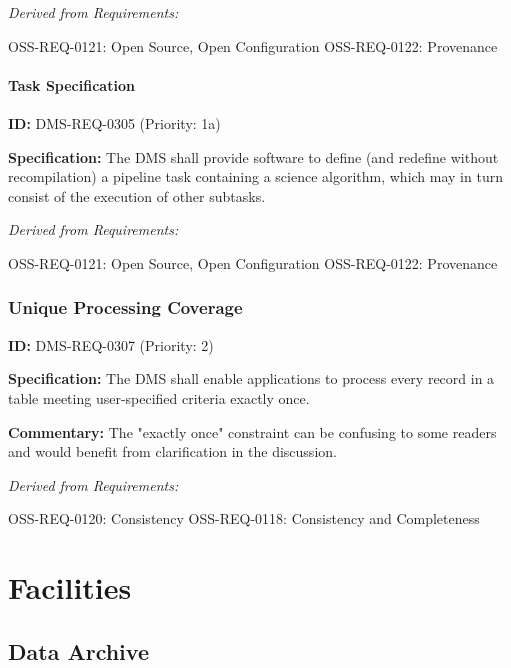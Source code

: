 \documentclass[SE,toc,lsstdraft]{lsstdoc}
\begin{document}
\emph{Derived from Requirements:}

OSS-REQ-0121:
Open Source, Open Configuration \newline
OSS-REQ-0122:
Provenance \newline

\paragraph{Task Specification}\hfill  %

\label{DMS-REQ-0305}
\textbf{ID:} DMS-REQ-0305 (Priority: 1a)

\textbf{Specification:} The DMS shall provide software to define (and redefine without recompilation) a pipeline task containing a science algorithm, which may in turn consist of the execution of other subtasks.

\emph{Derived from Requirements:}

OSS-REQ-0121:
Open Source, Open Configuration \newline
OSS-REQ-0122:
Provenance \newline

\subsubsection{Unique Processing Coverage}

\label{DMS-REQ-0307}
\textbf{ID:} DMS-REQ-0307 (Priority: 2)

\textbf{Specification:} The DMS shall enable applications to process every record in a table meeting user-specified criteria exactly once.

\textbf{Commentary: }The "exactly once" constraint can be confusing to some readers and would benefit from clarification in the discussion.

\emph{Derived from Requirements:}

OSS-REQ-0120:
Consistency \newline
OSS-REQ-0118:
Consistency and Completeness \newline

\section{Facilities}

\subsection{Data Archive}
\end{document}
